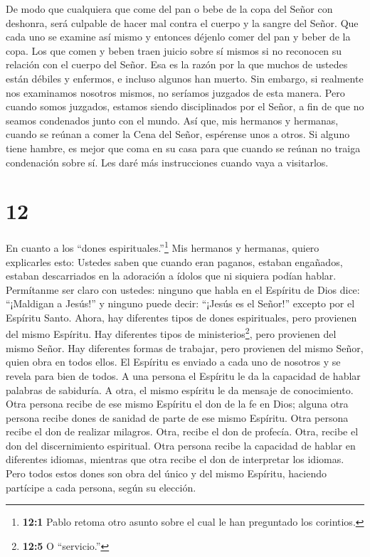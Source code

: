  De modo que cualquiera que come del pan o bebe de la copa
del Señor con deshonra, será culpable de hacer mal contra el cuerpo y la
sangre del Señor.  Que cada uno se examine así mismo y
entonces déjenlo comer del pan y beber de la copa.  Los que
comen y beben traen juicio sobre sí mismos si no reconocen su relación
con el cuerpo del Señor.  Esa es la razón por la que muchos
de ustedes están débiles y enfermos, e incluso algunos han muerto.
 Sin embargo, si realmente nos examinamos nosotros mismos,
no seríamos juzgados de esta manera.  Pero cuando somos
juzgados, estamos siendo disciplinados por el Señor, a fin de que no
seamos condenados junto con el mundo.  Así que, mis
hermanos y hermanas, cuando se reúnan a comer la Cena del Señor,
espérense unos a otros.  Si alguno tiene hambre, es mejor
que coma en su casa para que cuando se reúnan no traiga condenación
sobre sí. Les daré más instrucciones cuando vaya a visitarlos.

\hypertarget{section-11}{%
\section{12}\label{section-11}}

 En cuanto a los ``dones espirituales.''\footnote{\textbf{12:1}
  Pablo retoma otro asunto sobre el cual le han preguntado los
  corintios.} Mis hermanos y hermanas, quiero explicarles esto:
 Ustedes saben que cuando eran paganos, estaban engañados,
estaban descarriados en la adoración a ídolos que ni siquiera podían
hablar.  Permítanme ser claro con ustedes: ninguno que habla
en el Espíritu de Dios dice: ``¡Maldigan a Jesús!'' y ninguno puede
decir: ``¡Jesús es el Señor!'' excepto por el Espíritu Santo.
 Ahora, hay diferentes tipos de dones espirituales, pero
provienen del mismo Espíritu.  Hay diferentes tipos de
ministerios\footnote{\textbf{12:5} O ``servicio.''}, pero provienen del
mismo Señor.  Hay diferentes formas de trabajar, pero
provienen del mismo Señor, quien obra en todos ellos.  El
Espíritu es enviado a cada uno de nosotros y se revela para bien de
todos.  A una persona el Espíritu le da la capacidad de
hablar palabras de sabiduría. A otra, el mismo espíritu le da mensaje de
conocimiento.  Otra persona recibe de ese mismo Espíritu el
don de la fe en Dios; alguna otra persona recibe dones de sanidad de
parte de ese mismo Espíritu.  Otra persona recibe el don de
realizar milagros. Otra, recibe el don de profecía. Otra, recibe el don
del discernimiento espiritual. Otra persona recibe la capacidad de
hablar en diferentes idiomas, mientras que otra recibe el don de
interpretar los idiomas.  Pero todos estos dones son obra
del único y del mismo Espíritu, haciendo partícipe a cada persona, según
su elección.

